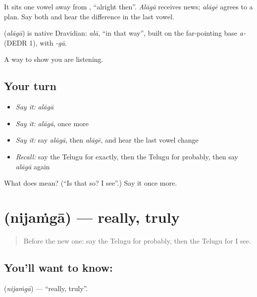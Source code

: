 It sits one vowel away from \textbf{}, \textquotedblleft{}alright then\textquotedblright{}. \emph{Alāgā} receives news; \emph{alāgē} agrees to a plan. Say both and hear the difference in the last vowel.

\begin{cousinweb}
\textbf{} (\emph{alāgā}) is native Dravidian: \emph{alā}, \textquotedblleft{}in that way\textquotedblright{}, built on the far-pointing base \emph{a-} (DEDR 1), with \emph{-gā}.
\end{cousinweb}

\begin{grammarlens}[title={What you've built}]
A way to show you are listening.
\end{grammarlens}

\subsection*{Your turn}
\begin{itemize}
\raggedright
  \item \emph{Say it:} \emph{alāgā}
  \item \emph{Say it:} \emph{alāgā}, once more
  \item \emph{Say it:} say \emph{alāgā}, then \emph{alāgē}, and hear the last vowel change
  \item \emph{Recall:} say the Telugu for exactly, then the Telugu for probably, then say \emph{alāgā} again
\end{itemize}

\begin{tcolorbox}[breakable,colback=teal!4,colframe=teal!35!black,title={Before you move on}]
What does  mean? (\textquotedblleft{}Is that so? I see\textquotedblright{}.) Say it once more.
\end{tcolorbox}
\section[\texorpdfstring{\te{నిజంగా} (nijaṁgā)}{నిజంగా (nijaṁgā)}]{ (nijaṁgā) — really, truly}

\label{lesson:TE-C87-really}



\begin{quote}
Before the new one: say the Telugu for probably, then the Telugu for I see.
\end{quote}

\subsection*{You'll want to know: }
\textbf{} (\emph{nijaṁgā}) — \textquotedblleft{}really, truly\textquotedblright{}.

